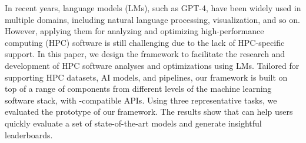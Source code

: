 In recent years, language models (LMs), such as GPT-4, have been widely used in multiple domains, including natural language processing, visualization, and so on. However, applying them for analyzing and optimizing high-performance computing (HPC) software is still challenging due to the lack of HPC-specific support. In this paper, we design the \ourwork framework to facilitate the research and development of HPC software analyses and optimizations using LMs. Tailored for supporting HPC datasets, AI models, and pipelines, our framework is built on top of a range of components from different levels of the machine learning software stack, with \face-compatible APIs. Using three representative tasks, we evaluated the prototype of our framework. The results show that \ourwork can help users quickly evaluate a set of state-of-the-art models and generate insightful leaderboards.

